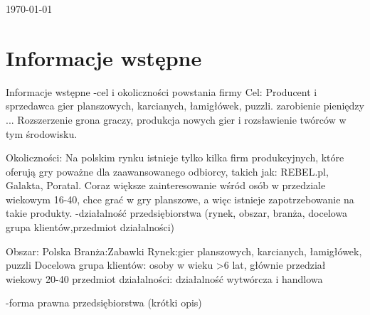 \documentclass[a4paper, 11pt]{article}
\begin{document}
\begin{titlepage}
		
		
		{\large \today}\\[3cm] %
		
		
		
		
		\vfill %
		
	\end{titlepage}
	
	
	\tableofcontents
	\vfill

	
	\section{Informacje wstępne}
	\indent
		
Informacje wstępne
-cel i okoliczności powstania firmy
Cel:
Producent i sprzedawca gier planszowych, karcianych, łamigłówek, puzzli. 
zarobienie pieniędzy ... Rozszerzenie grona graczy, produkcja nowych gier i rozsławienie twórców w tym środowisku.

Okoliczności: 
	Na polskim rynku istnieje tylko kilka firm produkcyjnych, które oferują gry poważne dla zaawansowanego odbiorcy, takich jak: REBEL.pl, Galakta, Poratal. Coraz większe zainteresowanie wśród osób w przedziale wiekowym 16-40, chce grać w gry planszowe, a więc istnieje zapotrzebowanie na takie produkty.
-działalność przedsiębiorstwa (rynek, obszar, branża, docelowa grupa klientów,przedmiot działalności)

Obszar: Polska
Branża:Zabawki	
Rynek:gier planszowych, karcianych, łamigłówek, puzzli
Docelowa grupa klientów: osoby w wieku >6 lat, głównie przedział wiekowy 20-40
przedmiot działalności: działalność wytwórcza i handlowa

-forma prawna przedsiębiorstwa (krótki opis)
\end{document}
